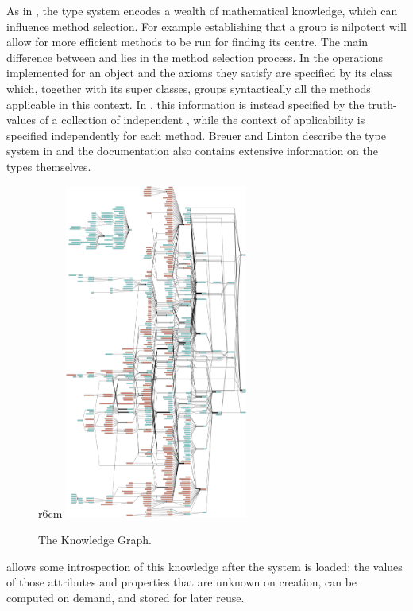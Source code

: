As in \Sage, the \GAP type system encodes a wealth of mathematical
knowledge, which can influence method selection. For example
establishing that a group is nilpotent will allow for more efficient
methods to be run for finding its centre. The main difference between \Sage
and \GAP lies in the method selection process. In \Sage the operations
implemented for an object and the axioms they satisfy are specified by
its class which, together with its super classes, groups syntactically
all the methods applicable in this context. In \GAP, this information
is instead specified by the truth-values of a collection of
independent , while the context of applicability is
specified independently for each method.
%
Breuer and Linton describe the \GAP type system in \cite{breuer-linton} and
the \GAP documentation \cite{GAP4} also contains extensive information on the types
themselves.

\begin{figure}r{6cm}%
  \includegraphics[width=6cm]{gap-graph.pdf}\vspace*{-.5em}
  \caption{The \GAP Knowledge Graph.\label{fig:gap-graph}}\vspace*{-2em}
\end{figure}
\GAP allows some introspection of this knowledge after the system is
loaded: the values of those attributes and properties that are unknown on creation,
can be computed on demand, and stored for later reuse.%

